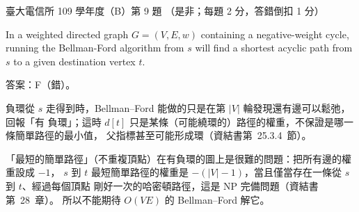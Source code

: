 \begin{pastexam}[label={px:ntu-109-comm-dsa-09}]{臺大電信所 109 學年度（B）第 9 題}
（是非；每題 2 分，答錯倒扣 1 分）

In a weighted directed graph $G=(V,E,w)$ containing a negative-weight cycle, running the
Bellman-Ford algorithm from $s$ will find a shortest acyclic path from $s$ to a given destination
vertex $t$.
\end{pastexam}

\begin{pastsoln}
答案：F（錯）。

負環從 $s$ 走得到時，Bellman--Ford 能做的只是在第 $|V|$ 輪發現還有邊可以鬆弛，回報「有
負環」；這時 $d[t]$ 只是某條（可能繞環的）路徑的權重，不保證是哪一條簡單路徑的最小值，
父指標甚至可能形成環（資結書第~25.3.4~節）。

「最短的簡單路徑」（不重複頂點）在有負環的圖上是很難的問題：把所有邊的權重設成 $-1$，
$s$ 到 $t$ 最短簡單路徑的權重是 $-(|V| - 1)$，當且僅當存在一條從 $s$ 到 $t$、經過每個頂點
剛好一次的哈密頓路徑，這是 NP 完備問題（資結書第~28~章）。 所以不能期待 $O(VE)$ 的
Bellman--Ford 解它。
\end{pastsoln}
